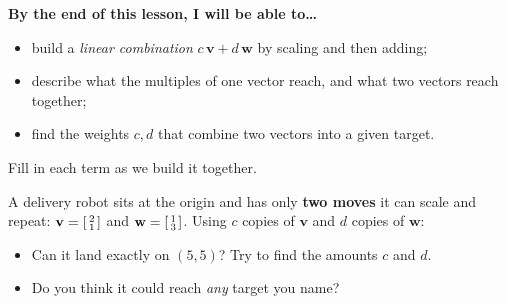 \documentclass[10pt]{article}
\newcommand{\vv}{\mathbf{v}}
\newcommand{\ww}{\mathbf{w}}
\begin{document}

\vspace{0.12in}

\begin{objectivebox}
\textbf{By the end of this lesson, I will be able to\dots}
\begin{itemize}\setlength{\itemsep}{2pt}
  \item build a \emph{linear combination} $c\,\vv + d\,\ww$ by scaling and then adding;
  \item describe what the multiples of one vector reach, and what two vectors reach together;
  \item find the weights $c,d$ that combine two vectors into a given target.
\end{itemize}
\end{objectivebox}

\vspace{0.10in}

\begin{vocabbox}
\small
Fill in each term as we build it together.
\par\vspace{2pt}
\end{vocabbox}

\begin{hookbox}
A delivery robot sits at the origin and has only \textbf{two moves} it can scale and repeat:
$\vv = \begin{bsmallmatrix} 2 \\ 1 \end{bsmallmatrix}$ and
$\ww = \begin{bsmallmatrix} 1 \\ 3 \end{bsmallmatrix}$. Using $c$ copies of $\vv$ and $d$ copies
of $\ww$:
\begin{itemize}\setlength{\itemsep}{1pt}
  \item Can it land exactly on $(5,5)$? Try to find the amounts $c$ and $d$. 
  \item Do you think it could reach \emph{any} target you name? 
\end{itemize}
\end{hookbox}
\end{document}
